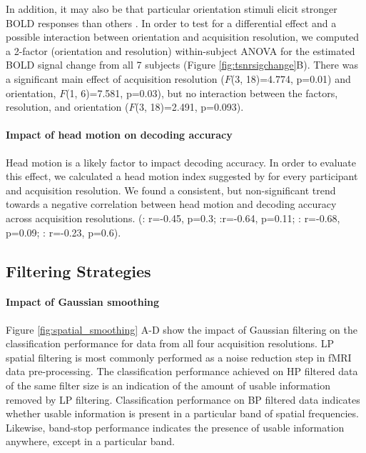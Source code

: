 In addition, it may also be that particular orientation stimuli elicit stronger
BOLD responses than others \citep[e.g., a grating along the cardinal
orientations;][]{furmanski_2000}.
In order to test for a differential effect and a possible interaction between
orientation and acquisition resolution, we computed a 2-factor (orientation and
resolution) within-subject ANOVA for the estimated BOLD signal change from
all 7 subjects (Figure \ref{fig:tsnrsigchange}B). 
There was a significant main effect of acquisition resolution ($F$(3, 18)=4.774, p=0.01)
and orientation, $F$(1, 6)=7.581, p=0.03), but no interaction between
the factors, resolution, and orientation ($F$(3, 18)=2.491, p=0.093).


\paragraph*{Impact of head motion on decoding accuracy}
%
Head motion is a likely factor to impact decoding accuracy. In order to
evaluate this effect, we calculated a head motion index suggested by
\citet{alink_2013} for every participant and acquisition resolution. 
%
We found a consistent, but non-significant trend towards a negative correlation 
between head motion and decoding accuracy across acquisition resolutions.
(: r=-0.45, p=0.3; :r=-0.64, p=0.11; : r=-0.68, p=0.09; : r=-0.23, p=0.6).
%


\subsection*{Filtering Strategies}

\paragraph*{Impact of Gaussian smoothing}
%
Figure \ref{fig:spatial_smoothing} A-D show the impact of Gaussian filtering on
the classification performance for data from all four acquisition resolutions.
LP spatial filtering is most commonly performed as a noise reduction step in
fMRI data pre-processing. The classification performance achieved on HP
filtered data of the same filter size is an indication of the amount of usable
information removed by LP filtering. Classification performance on BP filtered
data indicates whether usable information is present in a particular band of
spatial frequencies. Likewise, band-stop performance indicates the presence of
usable information anywhere, except in a particular band.

